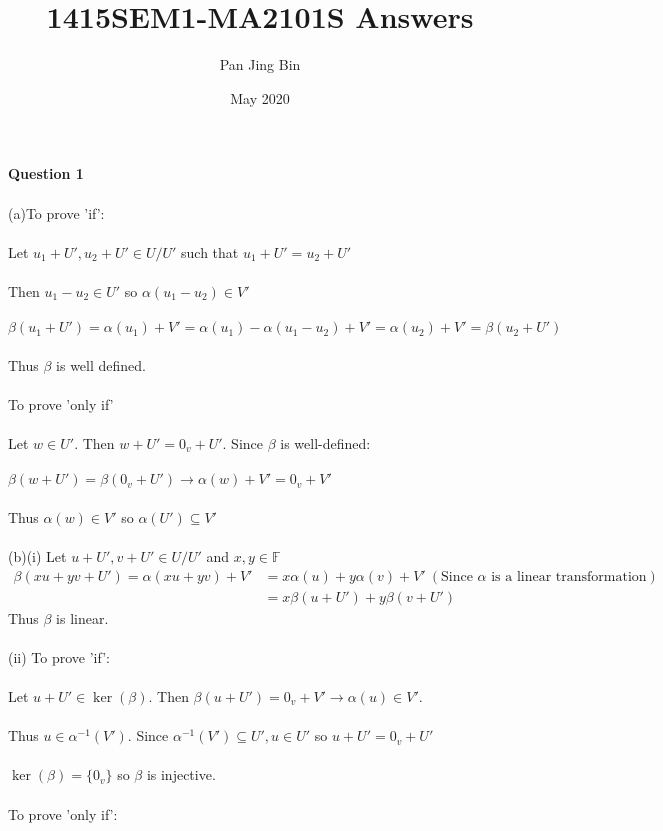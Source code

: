 \documentclass{article}
\title{1415SEM1-MA2101S Answers}
\author{Pan Jing Bin}
\date{May 2020}
\begin{document}
\maketitle
\textbf{Question 1}\\\\
(a)To prove 'if':\\\\
Let $u_1 + U',u_2 + U' \in U/U'$ such that $u_1+U' = u_2+U'$\\\\
Then $u_1-u_2 \in U'$ so $\alpha(u_1-u_2) \in V'$\\\\
$\beta(u_1+U') = \alpha(u_1) + V' = \alpha(u_1) - \alpha(u_1-u_2) + V' = \alpha(u_2) + V' = \beta(u_2 + U')$\\\\
Thus $\beta$ is well defined.\\\\
To prove 'only if'\\\\
Let $w\in U'$. Then $w+U' = 0_v + U'$. Since $\beta$ is well-defined:\\\\
$\beta(w+U') = \beta(0_v + U') \to \alpha(w) + V' = 0_v + V'$\\\\
Thus $\alpha(w) \in V'$ so $\alpha(U')\subseteq V'$\\\\
(b)(i) Let $u+U',v+U'\in U/U'$ and $x,y\in \mathbb{F}$
\begin{align*}
\beta(xu + yv + U') = \alpha(xu+yv) + V'  &= x\alpha(u) + y\alpha(v) + V' \ (\text{Since } \alpha \text{ is a linear transformation})\\ &= x\beta(u+U') + y\beta(v+U')
\end{align*}
Thus $\beta$ is linear.\\\\
(ii) To prove 'if':\\\\
Let $u+U' \in \ker(\beta)$. Then $\beta(u+U') = 0_v + V' \to \alpha(u) \in V'$.\\\\
Thus $u\in\alpha^{-1}(V')$. Since $\alpha^{-1}(V')\subseteq U', u\in U'$ so $u+U' = 0_v + U'$\\\\
$\ker(\beta) = \{0_v\}$ so $\beta$ is injective.\\\\
To prove 'only if':\\\\
\end{document}
